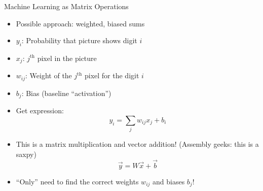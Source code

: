 \begin{frame}{Machine Learning as Matrix Operations}
%
\begin{itemize}
\item Possible approach: weighted, biased sums
\item $y_i$: Probability that picture shows digit $i$
\item $x_j$: $j^{\text{th}}$ pixel in the picture
\item $w_{ij}$: Weight of the $j^{\text{th}}$ pixel for the digit $i$
\item $b_j$: Bias (baseline \enquote{activation})
\item Get expression:
	\[ y_i = \sum_j w_{ij} x_j + b_i \]
\item This is a matrix multiplication and vector addition! (Assembly geeks: this is a saxpy)
	\[ \vec{y} = W \vec{x} + \vec{b} \]
\item[\Thus] \enquote{Only} need to find the correct weights $w_{ij}$ and biases $b_j$!
\end{itemize}
%
\end{frame}


